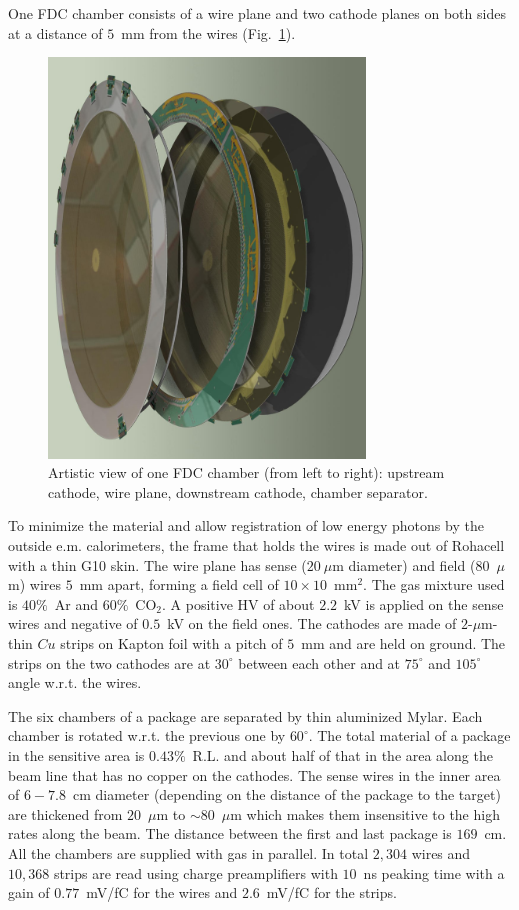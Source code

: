 One FDC chamber consists of a wire plane and two cathode planes on both sides at a distance of $5$~mm from the wires (Fig.~\ref{FDC_OneCell}).
\begin{figure}[tbp]
\begin{center}
\includegraphics[width=0.75\textwidth]{figures/FDC_OneCell.jpg}  
\caption{\label{FDC_OneCell}
Artistic view of one FDC chamber (from left to right): upstream cathode, wire plane, downstream cathode, chamber separator.
}
\end{center}
\end{figure}
To minimize the material and allow registration of low energy photons by the outside e.m. calorimeters,
the frame that holds the wires is made out of Rohacell with a thin G10 skin.
The wire plane has sense ($20~\mu$m diameter) and field ($80$~$\mu$m) wires $5$~mm apart, forming a field cell of $10\times 10$~mm$^2$. 
The gas mixture used is $40\%$~Ar and $60\%$~CO$_2$.
A positive HV of about $2.2$~kV is applied on the sense wires and negative of $0.5$~kV on the field ones. 
The cathodes are made of $2$-$\mu$m-thin $Cu$ strips on Kapton foil with a pitch of $5$~mm and are held on ground. The strips on the two cathodes are at $30^\circ $ between each other and at $75^\circ $ and $105^\circ $ angle w.r.t. the wires.

The six chambers of a package are separated by thin aluminized Mylar.
Each chamber is rotated w.r.t. the previous one by $60^\circ $.
The total material of a package in the sensitive area is $0.43\%$~R.L. and about half of that in the area along the beam line that has no copper on the cathodes.
The sense wires in the inner area of $6-7.8$~cm diameter (depending on the distance of the package to the target) are thickened from $20$~$\mu$m to $\sim 80$~$\mu$m which makes them insensitive to the high rates along the beam.
The distance between the first and last package is $169$~cm. 
All the chambers are supplied with gas in parallel. 
In total $2,304$ wires and $10,368$ strips are read using charge preamplifiers with $10$~ns peaking time with a gain of $0.77$~mV/fC for the wires and $2.6$~mV/fC for the strips.

